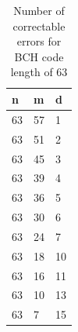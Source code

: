 \begin{table}
\begin{tabular}{lll}
\hline
 n  &   m &   d \\ \hline
 63 &  57 &   1 \\
 63 &  51 &   2 \\
 63 &  45 &   3 \\
 63 &  39 &   4 \\
 63 &  36 &   5 \\
 63 &  30 &   6 \\
 63 &  24 &   7 \\
 63 &  18 &  10 \\
 63 &  16 &  11 \\
 63 &  10 &  13 \\
 63 &   7 &  15
\end{tabular}
\caption{Number of correctable errors for BCH code length of 63}
\label{tab:bch63}
\end{table}

